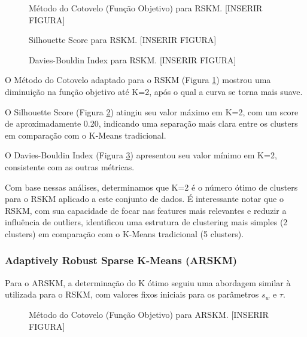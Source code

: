 \documentclass[conference]{IEEEtran}
\begin{document}
\begin{figure}[!t]
\centering
\caption{Método do Cotovelo (Função Objetivo) para RSKM. [INSERIR FIGURA]}
\label{fig:rskm_elbow}
\end{figure}

\begin{figure}[!t]
\centering
\caption{Silhouette Score para RSKM. [INSERIR FIGURA]}
\label{fig:rskm_silhouette}
\end{figure}

\begin{figure}[!t]
\centering
\caption{Davies-Bouldin Index para RSKM. [INSERIR FIGURA]}
\label{fig:rskm_dbi}
\end{figure}

O Método do Cotovelo adaptado para o RSKM (Figura \ref{fig:rskm_elbow}) mostrou uma diminuição na função objetivo até K=2, após o qual a curva se torna mais suave.

O Silhouette Score (Figura \ref{fig:rskm_silhouette}) atingiu seu valor máximo em K=2, com um score de aproximadamente 0.20, indicando uma separação mais clara entre os clusters em comparação com o K-Means tradicional.

O Davies-Bouldin Index (Figura \ref{fig:rskm_dbi}) apresentou seu valor mínimo em K=2, consistente com as outras métricas.

Com base nessas análises, determinamos que K=2 é o número ótimo de clusters para o RSKM aplicado a este conjunto de dados. É interessante notar que o RSKM, com sua capacidade de focar nas features mais relevantes e reduzir a influência de outliers, identificou uma estrutura de clustering mais simples (2 clusters) em comparação com o K-Means tradicional (5 clusters).

\subsubsection{Adaptively Robust Sparse K-Means (ARSKM)}
Para o ARSKM, a determinação do K ótimo seguiu uma abordagem similar à utilizada para o RSKM, com valores fixos iniciais para os parâmetros $s_w$ e $\tau$.

\begin{figure}[!t]
\centering
\caption{Método do Cotovelo (Função Objetivo) para ARSKM. [INSERIR FIGURA]}
\label{fig:arskm_elbow}
\end{figure}
\end{document}
